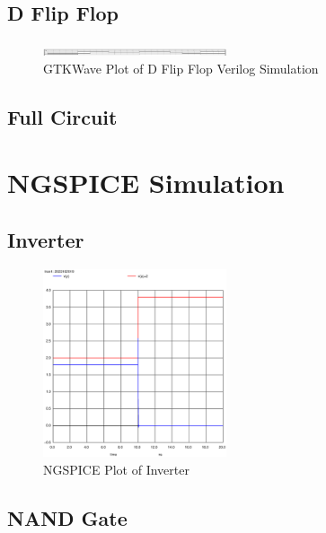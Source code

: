 \documentclass[conference]{IEEEtran}
\begin{document}
\subsection{D Flip Flop}

\begin{figure}[H]
    \centering
    \includegraphics[width=0.48\textwidth]{images/verilog_d_ff.png}
    \caption{GTKWave Plot of  D Flip Flop Verilog Simulation}
\end{figure}
\subsection{Full Circuit}

\section{NGSPICE Simulation}

\subsection{Inverter}

\begin{figure}[H]
    \centering
    \includegraphics[width=0.48\textwidth]{images/inv_cmos_tran.eps}
    \caption{NGSPICE Plot of Inverter}
\end{figure}

\subsection{NAND Gate}
\end{document}
